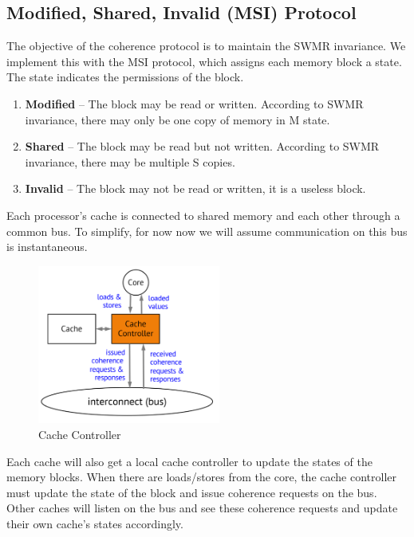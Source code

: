 \documentclass{article}
\begin{document}
\subsection{Modified, Shared, Invalid (MSI) Protocol}

The objective of the coherence protocol is to maintain the SWMR invariance.
We implement this with the MSI protocol, which assigns each memory block a state.  The state indicates the permissions of the block. 

\begin{enumerate}
\item \textbf{Modified} -- The block may be read or written. According to SWMR invariance, there may only be one copy of memory in M state. 

\item \textbf{Shared} -- The block may be read but not written. According to SWMR invariance, there may be multiple S copies.

\item \textbf{Invalid} -- The block may not be read or written, it is a useless block.

\end{enumerate}

Each processor's cache is connected to shared memory and each other through a common bus. To simplify, for now now we will assume communication on this bus is instantaneous. 


 \begin{figure}[ht!]
\centering
\includegraphics[width=60mm]{img/cachecontrol.png}
\caption{Cache Controller}
\end{figure}

Each cache will also get a local cache controller to update the states of the memory blocks. When there are loads/stores from the core, the cache controller must update the state of the block and issue coherence requests on the bus. Other caches will listen on the bus and see these coherence requests and update their own cache's states accordingly.
\end{document}
